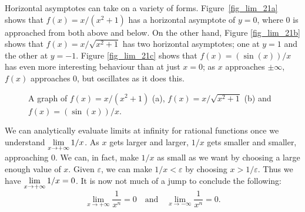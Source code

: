 Horizontal asymptotes can take on a variety of forms. Figure~\ref{fig_lim_21a} shows that $f(x) = x/(x^2+1)$ has a horizontal asymptote of $y=0$, where 0 is approached from both above and below. On the other hand, Figure \ref{fig_lim_21b} shows that $f(x) =x/\sqrt{x^2+1}$ has two horizontal asymptotes; one at $y=1$ and the other at $y=-1$. Figure \ref{fig_lim_21c} shows that $f(x) = (\sin (x))/x$ has even more interesting behaviour than at just $x=0$; as $x$ approaches $\pm\infty$, $f(x)$ approaches 0, but oscillates as it does this.\\%

\begin{figure}
\centerline{
\qquad
{}
\qquad
{}
}
\caption{A graph of $f(x) = x/(x^2+1)$ (a), $f(x) =x/\sqrt{x^2+1}$ (b) and $f(x) = (\sin (x))/x$. }
\end{figure}


We can analytically evaluate limits at infinity for rational functions once we understand $\displaystyle\lim_{x\rightarrow+\infty} 1/x$.  As $x$ gets larger and larger,   $1/x$ gets smaller and smaller, approaching 0.  We can, in fact, make $1/x$ as small as we want by choosing a large enough value of $x$.  Given $\varepsilon$, we can make $1/x<\varepsilon$  by choosing $x>1/\varepsilon$.  Thus we have $\displaystyle\lim_{x\rightarrow+\infty} 1/x=0$.  It is now not much of a jump to conclude the following:
$$\lim_{x\rightarrow+\infty}\frac1{x^n}=0\quad \text{and}\quad \lim_{x\rightarrow-\infty}\frac1{x^n}=0.$$

